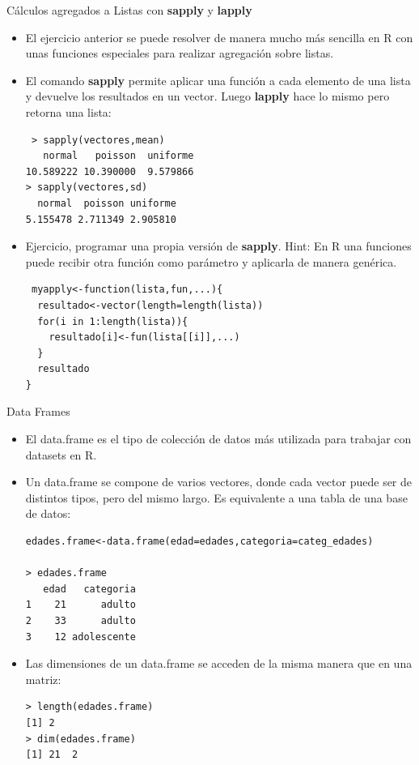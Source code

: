 \documentclass[handout]{beamer}
\begin{document}
\begin{frame}[fragile]{Cálculos agregados a Listas con \textbf{sapply} y \textbf{lapply}}
 \scriptsize{
 \begin{itemize}
  \item El ejercicio anterior se puede resolver de manera mucho más sencilla en R con unas funciones especiales para realizar agregación sobre listas.
  \item El comando \textbf{sapply} permite aplicar una función a cada elemento de una lista y devuelve los resultados en un vector. Luego \textbf{lapply} hace lo mismo pero retorna una lista:
 \begin{verbatim}
 > sapply(vectores,mean)
   normal   poisson  uniforme 
10.589222 10.390000  9.579866 
> sapply(vectores,sd)
  normal  poisson uniforme 
5.155478 2.711349 2.905810  
 \end{verbatim}  

 \item Ejercicio, programar una propia versión de \textbf{sapply}. Hint: En R una funciones puede recibir otra  función como parámetro y aplicarla de manera genérica. \pause
\begin{verbatim}
 myapply<-function(lista,fun,...){
  resultado<-vector(length=length(lista))
  for(i in 1:length(lista)){
    resultado[i]<-fun(lista[[i]],...)
  }
  resultado  
}
\end{verbatim}
  
 \end{itemize}
 
 }
\end{frame}


\begin{frame}[fragile]{Data Frames}
\scriptsize{
\begin{itemize}
 \item El data.frame es el tipo de colección de datos más utilizada para trabajar con datasets en R.
 
 \item Un data.frame se compone de varios vectores, donde cada vector puede ser de distintos tipos, pero del mismo largo. Es equivalente a una tabla de una base de datos:
 \begin{verbatim}
edades.frame<-data.frame(edad=edades,categoria=categ_edades)

> edades.frame
   edad   categoria
1    21      adulto
2    33      adulto
3    12 adolescente
\end{verbatim}

\item Las dimensiones de un data.frame se acceden de la misma manera que en una matriz:
\begin{verbatim}
> length(edades.frame)
[1] 2
> dim(edades.frame)
[1] 21  2 
\end{verbatim}
 
\end{itemize}



}
\end{frame}
\end{document}
